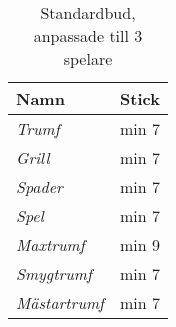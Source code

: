 %
%
%
%

\begin{table}
	\caption{Standardbud, anpassade till $3$ spelare}\label{tab:standardBids3}
	\begin{center}
		\begin{tabular}{l|c}
			\textbf{Namn} & \textbf{Stick}
			\\ \hline
			\textit{Trumf} & min 7 \\
			\textit{Grill} & min 7 \\
			\textit{Spader} & min 7 \\
			\textit{Spel} & min 7 \\
			\textit{Maxtrumf} & min 9 \\
			\textit{Smygtrumf} & min 7 \\
			\textit{Mästartrumf} & min 7
		\end{tabular}
	\end{center}
\end{table}
